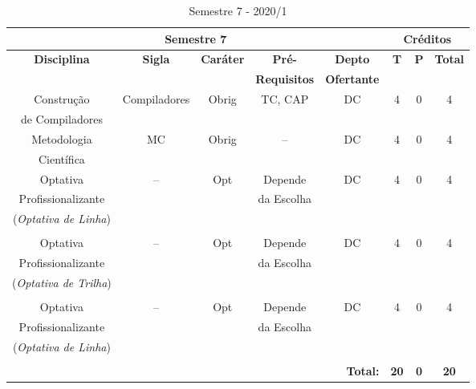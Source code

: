 
\begin{table}[H]
\caption{Semestre 7 - 2020/1}
\centering
\footnotesize
\begin{tabular}{|c|c|c|c|c|c|c|c|} %
\hline
\hline
\multicolumn{5}{|c|}{\textbf{Semestre 7}}  &  \multicolumn{3}{|c|}{\textbf{Créditos}} \\
\hline
\hline
\textbf{Disciplina} & \textbf{Sigla} & \textbf{Caráter} & \textbf{Pré-} & \textbf{Depto} &  \textbf{T}  &  \textbf{P}  & \textbf{Total} \\ 
& & & \textbf{Requisitos}  & \textbf{Ofertante} & & & \\
\hline 

Construção & Compiladores & Obrig & TC, CAP & DC & 4 & 0 & 4 \\
de Compiladores & & & & & & &  \\
\hline


Metodologia & MC & Obrig & -- & DC & 4 & 0 & 4 \\
Científica & & & & & & &  \\
\hline

Optativa & --  & Opt & Depende & DC  & 4 & 0 & 4 \\
Profissionalizante & & & da Escolha & & & & \\
(\textit{Optativa de Linha}) & & & & & & & \\
& & & & & & & \\
\hline

Optativa & --  & Opt & Depende & DC  & 4 & 0 & 4 \\
Profissionalizante & & & da Escolha & & & & \\
(\textit{Optativa de Trilha}) & & & & & & & \\
& & & & & & & \\
\hline


Optativa & --  & Opt & Depende & DC  & 4 & 0 & 4 \\
Profissionalizante & & & da Escolha & & & & \\
(\textit{Optativa de Linha}) & & & & & & & \\
& & & & & & & \\
\hline

\hline


\hline
\hline
\multicolumn{5}{|r|}{\textbf{Total:}}  &  \textbf{20}  &  \textbf{0}   & \textbf{20} \\ %
\hline
\hline
\end{tabular}
\label{tab:matriz7m2}
\end{table}



